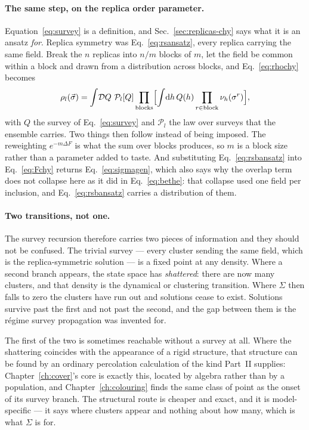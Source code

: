 \paragraph{The same step, on the replica order parameter.}
Equation~\eqref{eq:survey} is a definition, and
Sec.~\ref{sec:replicas-chy} says what it is an ansatz \emph{for}. Replica
symmetry was Eq.~\eqref{eq:rsansatz}, every replica carrying the same field.
Break the $n$ replicas into $n/m$ blocks of $m$, let the field be common within
a block and drawn from a distribution across blocks, and
Eq.~\eqref{eq:rhochy} becomes
\begin{equation}
  \rho_{l}(\vec\sigma)=\int\!\mathcal{D}Q\ \mathcal{P}_{l}[Q]
    \prod_{\text{blocks}}\Bigl[\int\!\mathrm{d}h\,Q(h)
      \prod_{r\in\text{block}}\nu_{h}(\sigma^{r})\Bigr],
  \label{eq:rsbansatz}
\end{equation}
with $Q$ the survey of Eq.~\eqref{eq:survey} and $\mathcal{P}_{l}$ the law over
surveys that the ensemble carries. Two things then follow instead of being
imposed. The reweighting $e^{-m\Delta F}$ is what the sum over blocks produces,
so $m$ is a block size rather than a parameter added to taste. And substituting
Eq.~\eqref{eq:rsbansatz} into Eq.~\eqref{eq:Fchy} returns
Eq.~\eqref{eq:sigmagen}, which also says why the overlap term does not collapse
here as it did in Eq.~\eqref{eq:bethe}: that collapse used one field per
inclusion, and Eq.~\eqref{eq:rsbansatz} carries a distribution of them.

\paragraph{Two transitions, not one.} The survey recursion therefore carries two
pieces of information and they should not be confused. The trivial survey ---
every cluster sending the same field, which is the replica-symmetric solution
--- is a fixed point at any density. Where a second branch appears, the state
space has \emph{shattered}: there are now many clusters, and that density is the
dynamical or clustering transition. Where $\Sigma$ then falls to zero the
clusters have run out and solutions cease to exist. Solutions survive past the
first and not past the second, and the gap between them is the r\'egime survey
propagation was invented for.

The first of the two is sometimes reachable without a survey at all. Where the
shattering coincides with the appearance of a rigid structure, that structure
can be found by an ordinary percolation calculation of the kind Part~II
supplies: Chapter~\ref{ch:cover}'s core is exactly this, located by algebra
rather than by a population, and Chapter~\ref{ch:colouring} finds the same class
of point as the onset of its survey branch. The structural route is cheaper and
exact, and it is model-specific --- it says where clusters appear and nothing
about how many, which is what $\Sigma$ is for.


